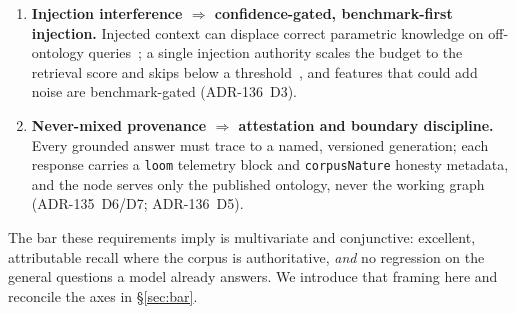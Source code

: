 \documentclass[10pt,twocolumn]{article}
\begin{document}
\begin{enumerate}[topsep=3pt,itemsep=2pt,leftmargin=1.5em]
\item \textbf{Injection interference $\Rightarrow$ confidence-gated, benchmark-first injection.}
Injected context can displace correct parametric knowledge on off-ontology
queries~\cite{shi2023distracted,yoran2024robust,longpre2021entity}; a single injection authority
scales the budget to the retrieval score and skips below a threshold~\cite{mallen2023trust}, and
features that could add noise are benchmark-gated (ADR-136~D3).
\item \textbf{Never-mixed provenance $\Rightarrow$ attestation and boundary discipline.} Every
grounded answer must trace to a named, versioned generation; each response carries a \texttt{loom}
telemetry block and \texttt{corpusNature} honesty metadata, and the node serves only the published
ontology, never the working graph (ADR-135~D6/D7; ADR-136~D5).
\end{enumerate}

The bar these requirements imply is multivariate and conjunctive: excellent, attributable recall
where the corpus is authoritative, \emph{and} no regression on the general questions a model
already answers. We introduce that framing here and reconcile the axes in \S\ref{sec:bar}.
\end{document}
